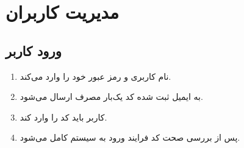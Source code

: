 \documentclass[10pt,a4paper]{article}
\begin{document}
\section{
	مدیریت کاربران
}

\subsection{
	ورود کاربر
}

\begin{enumerate}
	\item 
	نام کاربری و رمز عبور خود را وارد می‌کند.
	\item
	به ایمیل ثبت شده کد یک‌بار مصرف ارسال می‌شود.
	\item
	کاربر باید کد را وارد کند.
	\item
	پس از بررسی صحت کد فرایند ورود به سیستم کامل می‌شود.
	
\end{enumerate}
\end{document}
